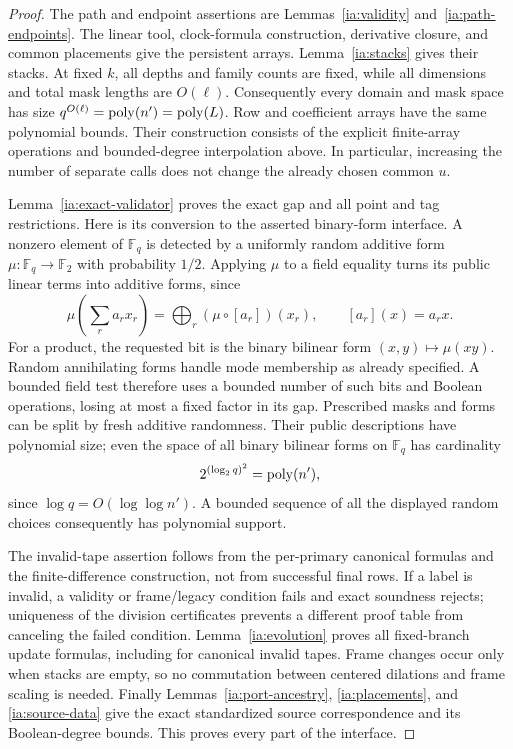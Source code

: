 \begin{proof}
The path and endpoint assertions are
Lemmas~\ref{ia:validity} and~\ref{ia:path-endpoints}.  The linear
tool, clock-formula construction, derivative closure, and common
placements give the persistent arrays.  Lemma~\ref{ia:stacks}
gives their stacks.  At fixed $k$, all depths and family counts
are fixed, while all dimensions and total mask lengths are
$O(\ell)$.  Consequently every domain and mask space has size
$q^{O(\ell)}=\operatorname{poly}(n')=\operatorname{poly}(L)$.  Row and coefficient arrays
have the same polynomial bounds.  Their construction consists
of the explicit finite-array operations and bounded-degree
interpolation above.  In particular, increasing the number of
separate calls does not change the already chosen common $u$.

Lemma~\ref{ia:exact-validator} proves the exact gap and all point
and tag restrictions.  Here is its conversion to the asserted
binary-form interface.  A nonzero element of $\mathbb F_q$ is
detected by a uniformly random additive form
$\mu:\mathbb F_q\to\mathbb F_2$ with probability $1/2$.
Applying $\mu$ to a field equality turns its public linear terms
into additive forms, since
\[
 \mu\left(\sum_r a_r x_r\right)
      =\bigoplus_r(\mu\circ[a_r])(x_r),
 \qquad [a_r](x)=a_rx.
\]
For a product, the requested bit is the binary bilinear form
$(x,y)\mapsto\mu(xy)$.  Random annihilating forms handle mode
membership as already specified.  A bounded field test therefore
uses a bounded number of such bits and Boolean operations,
losing at most a fixed factor in its gap.  Prescribed masks and
forms can be split by fresh additive randomness.  Their public
descriptions have polynomial size; even the space of all binary
bilinear forms on $\mathbb F_q$ has cardinality
\[
 2^{(\log_2 q)^2}=\operatorname{poly}(n'),
\]
since $\log q=O(\log\log n')$.  A bounded sequence of all the
displayed random choices consequently has polynomial support.

The invalid-tape assertion follows from the per-primary
canonical formulas and the finite-difference construction, not
from successful final rows.  If a label is invalid, a validity
or frame/legacy condition fails and exact soundness rejects;
uniqueness of the division certificates prevents a different
proof table from canceling the failed condition.
Lemma~\ref{ia:evolution} proves all fixed-branch update formulas,
including for canonical invalid tapes.  Frame changes occur
only when stacks are empty, so no commutation between centered
dilations and frame scaling is needed.  Finally
Lemmas~\ref{ia:port-ancestry}, \ref{ia:placements}, and
\ref{ia:source-data} give the exact standardized source
correspondence and its Boolean-degree bounds.  This proves
every part of the interface.
\end{proof}
